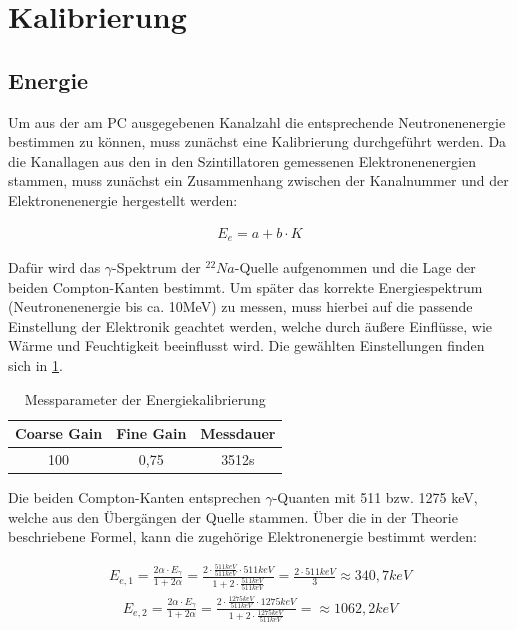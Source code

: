 \section{Kalibrierung}

\subsection{Energie}

Um aus der am PC ausgegebenen Kanalzahl die entsprechende Neutronenenergie bestimmen zu können, muss zunächst eine Kalibrierung durchgeführt werden. Da die Kanallagen aus den in den Szintillatoren gemessenen Elektronenenergien stammen, muss zunächst ein Zusammenhang zwischen der Kanalnummer und der Elektronenenergie hergestellt werden:

\begin{align}
E_e=a+b\cdot K
\end{align}

Dafür wird das $\gamma$-Spektrum der $^{22}Na$-Quelle aufgenommen und die Lage der beiden Compton-Kanten bestimmt. Um später das korrekte Energiespektrum (Neutronenenergie bis ca. 10MeV) zu messen, muss hierbei auf die passende Einstellung der Elektronik geachtet werden, welche durch äußere Einflüsse, wie Wärme und Feuchtigkeit beeinflusst wird. Die gewählten Einstellungen finden sich in \ref{para}. 

\begin{table}[h]
	\caption{Messparameter der Energiekalibrierung}
	\begin{tabular}{|c|c|c|}
	\hline
	 Coarse Gain & Fine Gain & Messdauer\\ \hline
	 100 & 0,75 & 3512s\\ \hline
	\end{tabular}
\label{para}
\end{table}

Die beiden Compton-Kanten entsprechen $\gamma$-Quanten mit 511 bzw. 1275 keV, welche aus den Übergängen der Quelle stammen. Über die in der Theorie beschriebene Formel, kann die zugehörige Elektronenergie bestimmt werden:

\begin{align}
E_{e,1}=\frac{2\alpha \cdot E_{\gamma}}{1 + 2\alpha} = \frac{2\cdot \frac{511keV}{511keV}\cdot 511keV}{1+2\cdot \frac{511keV}{511keV}}=\frac{2\cdot 511keV}{3}\approx 340,7keV
\end{align}
\begin{align}
E_{e,2}=\frac{2\alpha \cdot E_{\gamma}}{1 + 2\alpha} = \frac{2\cdot \frac{1275keV}{511keV}\cdot 1275keV}{1+2\cdot \frac{1275keV}{511keV}}=\approx 1062,2keV
\end{align}

